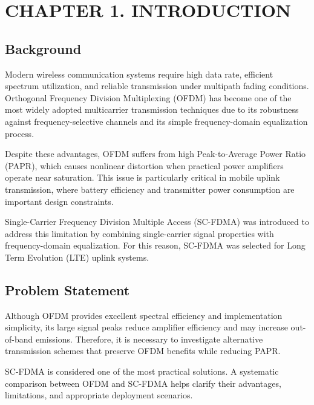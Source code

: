 \section*{CHAPTER 1. INTRODUCTION}

\setcounter{section}{1}
\setcounter{subsection}{0}
\setcounter{figure}{0}
\setcounter{table}{0}
\setcounter{equation}{0}

\subsection{Background}

Modern wireless communication systems require high data rate, efficient
spectrum utilization, and reliable transmission under multipath fading
conditions. Orthogonal Frequency Division Multiplexing (OFDM) has become
one of the most widely adopted multicarrier transmission techniques due to
its robustness against frequency-selective channels and its simple
frequency-domain equalization process.

Despite these advantages, OFDM suffers from high Peak-to-Average Power
Ratio (PAPR), which causes nonlinear distortion when practical power
amplifiers operate near saturation. This issue is particularly critical in
mobile uplink transmission, where battery efficiency and transmitter power
consumption are important design constraints.

Single-Carrier Frequency Division Multiple Access (SC-FDMA) was introduced
to address this limitation by combining single-carrier signal properties
with frequency-domain equalization. For this reason, SC-FDMA was selected
for Long Term Evolution (LTE) uplink systems.

\subsection{Problem Statement}

Although OFDM provides excellent spectral efficiency and implementation
simplicity, its large signal peaks reduce amplifier efficiency and may
increase out-of-band emissions. Therefore, it is necessary to investigate
alternative transmission schemes that preserve OFDM benefits while reducing
PAPR.

SC-FDMA is considered one of the most practical solutions. A systematic
comparison between OFDM and SC-FDMA helps clarify their advantages,
limitations, and appropriate deployment scenarios.

